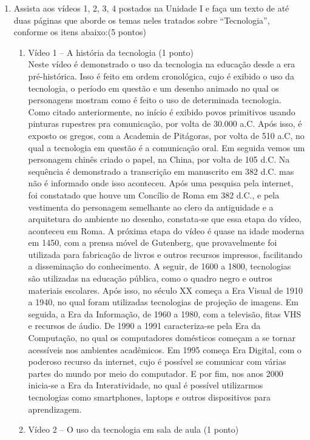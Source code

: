 \documentclass[a4paper, 12pt]{article}
\begin{document}
\begin{enumerate}
\item Assista aos vídeos 1, 2, 3, 4  postados na Unidade I e faça um texto de até duas páginas que aborde os temas neles tratados sobre “Tecnologia”, conforme os itens abaixo:(5 pontos)
  \begin{enumerate}
  \item Vídeo 1 – A história da tecnologia (1 ponto) \\ 
    Neste vídeo é demonstrado o uso da tecnologia na educação desde a era pré-histórica. Isso é feito em ordem cronológica, cujo é exibido o uso da tecnologia, o período em questão e um desenho animado no qual os personagens mostram como é feito o uso de determinada tecnologia. \\
    Como citado anteriormente, no início é exibido povos primitivos usando pinturas rupestres pra comunicação, por volta de 30.000 a.C. Após isso, é exposto os gregos, com a Academia de Pitágoras, por volta de 510 a.C, no qual a tecnologia em questão é a comunicação oral. Em seguida vemos um personagem chinês criado o papel, na China, por volta de 105 d.C. Na sequência é demonstrado a transcrição em manuscrito em 382 d.C. mas não é informado onde isso aconteceu. Após uma pesquisa pela internet, foi constatado que houve um Concílio de Roma em 382 d.C., e pela vestimenta do personagem semelhante ao clero da antiguidade e a arquitetura do ambiente no desenho, constata-se que essa etapa do vídeo, aconteceu em Roma. A próxima etapa do vídeo é quase na idade moderna em 1450, com a prensa móvel de Gutenberg, que provavelmente foi utilizada para fabricação de livros e outros recursos impressos, facilitando a disseminação do conhecimento. A seguir, de 1600 a 1800, tecnologias são utilizadas na educação pública, como o quadro negro e outros materiais escolares. Após isso, no século XX começa a Era Visual de 1910 a 1940, no qual foram utilizadas tecnologias de projeção de imagens. Em seguida, a Era da Informação, de 1960 a 1980, com a televisão, fitas VHS e recursos de áudio. De 1990 a 1991 caracteriza-se pela Era da Computação, no qual os computadores domésticos começam a se tornar acessíveis nos ambientes acadêmicos. Em 1995 começa Era Digital, com o poderoso recurso da internet, cujo é possível se comunicar com várias partes do mundo por meio do computador. E por fim, nos anos 2000 inicia-se a Era da Interatividade, no qual é possível utilizarmos tecnologias como smartphones, laptops e outros dispositivos para aprendizagem.  \\
  \item Vídeo 2 – O uso da tecnologia em sala de aula (1 ponto) \\

\end{enumerate}
\end{enumerate}
\end{document}
